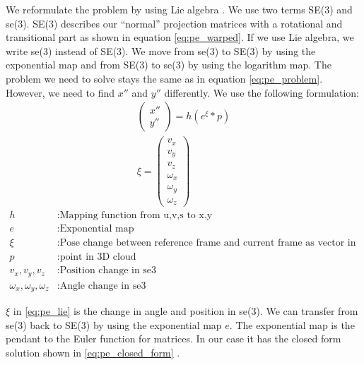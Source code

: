 \documentclass[11pt,a4paper,titlepage,oneside]{report}
\begin{document}
We reformulate the problem by using Lie algebra \cite{se3_explain}. We use two terms SE(3) and se(3). SE(3) describes our ``normal'' projection matrices with a rotational and transitional part as shown in equation \ref{eq:pe_warped}. If we use Lie algebra, we write se(3) instead of SE(3). We move from se(3) to SE(3) by using the exponential map and from SE(3) to se(3) by using the logarithm map. The problem we need to solve stays the same as in equation \ref{eq:pe_problem}. However, we need to find $x''$ and $y''$ differently. We use the following formulation:
\begin{equation}\label{eq:pe_lie}
  \begin{gathered}
    \begin{pmatrix}
      x''\\
      y''
    \end{pmatrix}
    =h(e^{\xi}*p)\\
    \xi=\begin{pmatrix}
      v_x\\
      v_y\\
      v_z\\
      \omega_x\\
      \omega_y\\
      \omega_z
    \end{pmatrix}
  \end{gathered}
\end{equation}
\begin{align*}
  h														&: \text{Mapping function from u,v,s to x,y}\\
  e      											&: \text{Exponential map}\\
  \xi    											&: \text{Pose change between reference frame and current frame as vector in SE(3)}\\
  p      											&: \text{point in 3D cloud}\\
	v_x,v_y,v_z									&: \text{Position change in se3}\\
	\omega_x,\omega_y,\omega_z	&: \text{Angle change in se3}
\end{align*}

$\xi$ in \ref{eq:pe_lie} is the change in angle and position in se(3). We can transfer from se(3) back to SE(3) by using the exponential map $e$. The exponential map is the pendant to the Euler function for matrices. In our case it has the closed form solution shown in \ref{eq:pe_closed_form} \cite{rvc}.
\end{document}
